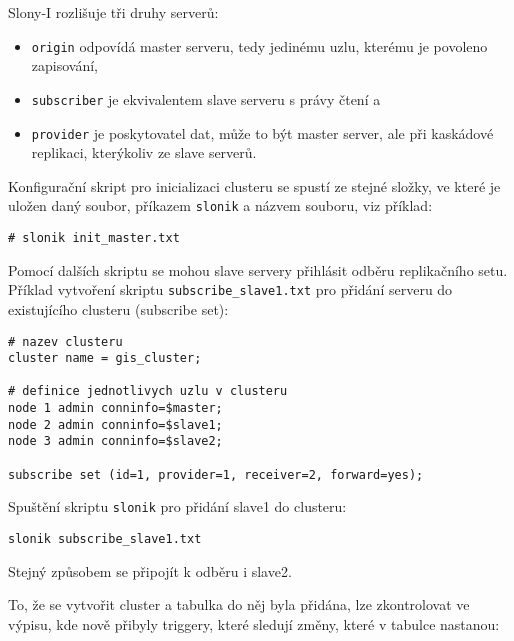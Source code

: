 Slony-I rozlišuje tři druhy serverů:
\begin{itemize}
\item \texttt{origin} odpovídá master serveru, tedy jedinému uzlu, kterému je povoleno zapisování,
\item \texttt{subscriber} je ekvivalentem slave serveru s právy čtení a 
\item \texttt{provider} je poskytovatel dat, může to být master server, ale při kaskádové replikaci, kterýkoliv ze slave serverů. 
\end{itemize}

Konfigurační skript pro inicializaci clusteru se spustí ze stejné složky, ve které je uložen daný soubor, příkazem \texttt{slonik} a názvem souboru, viz příklad:

\begin{lstlisting}
# slonik init_master.txt
\end{lstlisting}

Pomocí dalších skriptu se mohou slave servery přihlásit odběru replikačního setu. Příklad vytvoření skriptu \texttt{subscribe\_slave1.txt} pro přidání serveru do existujícího clusteru (subscribe set):

\begin{lstlisting}[identifierstyle=\color{black},stringstyle=\color{black},keywordstyle=\color{black}]
# nazev clusteru
cluster name = gis_cluster;

# definice jednotlivych uzlu v clusteru
node 1 admin conninfo=$master;
node 2 admin conninfo=$slave1;
node 3 admin conninfo=$slave2;

subscribe set (id=1, provider=1, receiver=2, forward=yes);
\end{lstlisting}

Spuštění skriptu \texttt{slonik} pro přidání slave1 do clusteru:

\begin{lstlisting}
slonik subscribe_slave1.txt
\end{lstlisting}

Stejný způsobem se připojít k odběru i slave2.

To, že se vytvořit cluster a tabulka do něj byla přidána, lze zkontrolovat ve výpisu, kde nově přibyly triggery, které sledují změny, které v tabulce nastanou:


